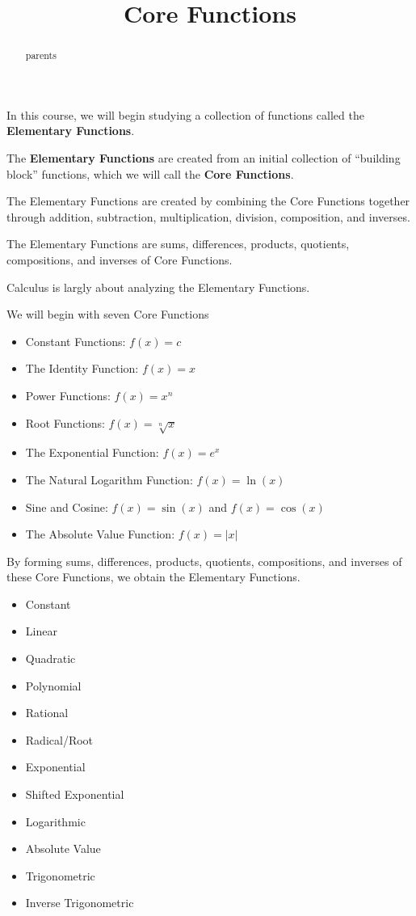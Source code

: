 \documentclass{ximera}
\title{Core Functions}
\begin{document}
\begin{abstract}
parents
\end{abstract}
\maketitle




In this course, we will begin studying a collection of functions called the \textbf{Elementary Functions}.

The \textbf{Elementary Functions} are created from an initial collection of ``building block'' functions, which we will call the \textbf{Core Functions}.

The Elementary Functions are created by combining the Core Functions together through addition, subtraction, multiplication, division, composition, and inverses.


The Elementary Functions are sums, differences, products, quotients, compositions, and inverses of Core Functions.

Calculus is largly about analyzing the Elementary Functions.






We will begin with seven Core Functions

\begin{itemize}
\item{Constant Functions: $f(x) = c$}
\item{The Identity Function: $f(x) = x$}
\item{Power Functions: $f(x) = x^n$}
\item{Root Functions: $f(x) = \sqrt[n]{x}$}
\item{The Exponential Function: $f(x) = e^x$}
\item{The Natural Logarithm Function: $f(x) = \ln(x)$}
\item{Sine and Cosine: $f(x) = \sin(x)$ and $f(x) = \cos(x)$}
\item{The Absolute Value Function: $f(x) = |x|$}
\end{itemize}


By forming sums, differences, products, quotients, compositions, and inverses of these Core Functions, we obtain the Elementary Functions.


\begin{itemize}
\item{Constant}
\item{Linear}
\item{Quadratic}
\item{Polynomial}
\item{Rational}
\item{Radical/Root}
\item{Exponential}
\item{Shifted Exponential}
\item{Logarithmic}
\item{Absolute Value}
\item{Trigonometric}
\item{Inverse Trigonometric}
\end{itemize}
\end{document}
